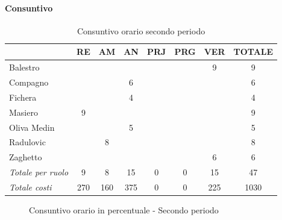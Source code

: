 \documentclass[a4paper,12pt]{article}
\begin{document}
            \paragraph{Consuntivo}
                \begin{table}[H]
                \centering
                \caption{Consuntivo orario secondo periodo}
                \begin{tabular}{|l|c|c|c|c|c|c|c|}
                \hline
                    \rowcolor{lightgray}{\textbf{Membro}} & {\textbf{RE}} & {\textbf{AM}} & {\textbf{AN}} & {\textbf{PRJ}} & {\textbf{PRG}} & {\textbf{VER}} & {\textbf{TOTALE}}\\
                \hline
                    Balestro & & & & & & 9 & 9\\
                \hline
                    Compagno & & & 6 & & & & 6\\
                \hline
                    Fichera & & & 4 & & & & 4\\
                \hline
                    Masiero & 9 & & & & & & 9\\
                \hline
                    Oliva Medin & & & 5 & & & & 5\\
                \hline
                    Radulovic & & 8 & & & & & 8\\
                \hline
                    Zaghetto & & & & & & 6 & 6\\
                \hline
                    \rowcolor{lightgray}\textit{Totale per ruolo} & 9 & 8 & 15 & 0 & 0 & 15 & 47\\
                \hline
                    \rowcolor{lightgray}\textit{Totale costi} & 270 & 160 & 375 & 0 & 0 & 225 & 1030\\
                \hline
                \end{tabular}
                \end{table}

                \begin{figure}[H]
                \centering
                \caption{Consuntivo orario in percentuale - Secondo periodo}
                \end{figure}
                
\end{document}
